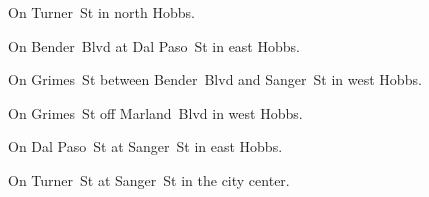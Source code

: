 
\begin{LocationList}

On   Turner~St in north Hobbs.

\Location{\GasStation \Gas}
On  Bender~Blvd at  Dal Paso~St in east Hobbs.

On Grimes~St between Bender~Blvd and Sanger~St in west Hobbs.

On Grimes~St off   Marland~Blvd in west Hobbs.

On  Dal Paso~St at Sanger~St in east Hobbs.

On Turner~St at Sanger~St in the city center.

\end{LocationList}
